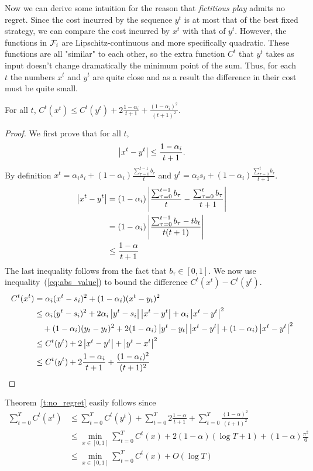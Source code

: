Now we can derive some intuition for the reason that \emph{fictitious play}
admits no regret. Since the cost incurred by the sequence $y^t$ is at most that
of the best fixed strategy, we can compare the cost incurred by $x^t$ with
that of $y^t$.  However, the functions in $\mathcal{F}_i$ are Lipschitz-continuous and more 
specifically quadratic. 
These functions are all "similar" to each other, so the extra function $C^t$ that $y^t$ takes
as input doesn't change dramatically the minimum point of the sum.
Thus, for each $t$ the numbers $x^t$ and $y^t$ are quite
close and as a result the difference in their cost must be quite small.

\begin{lemma}
  For all $t$,
  \(C^t(x^t) \leq C^t(y^t) + 2\frac{1-\alpha_i}{t+1} + \frac{(1-\alpha_i)^2}{(t+1)^2}\).
\end{lemma}
\begin{proof}
  We first prove that for all $t$,
  \begin{equation}\label{eq:abs_value}
    \left|x^t - y^t \right| \leq \frac{1-\alpha_i}{t+1}.
  \end{equation}
  By definition
  \(x^t = \alpha_i s_i + (1-\alpha_i)\frac{\sum_{\tau = 0}^{t-1} b_\tau}{t}\)
  and
  \( y^t = \alpha_i s_i + (1-\alpha_i)\frac{\sum_{\tau = 0}^t b_\tau}{t+1}\).
  \begin{align*}
    \left|x^t - y^t\right|
    &=
    (1-\alpha_i)\left|\frac{\sum_{\tau = 0}^{t-1}b_\tau}{t}
    - \frac{\sum_{\tau = 0}^t b_\tau}{t+1}\right|\\
    &=
    (1-\alpha_i)\left|\frac{\sum_{\tau = 0}^{t-1}b_\tau -tb_t}{t(t+1)}\right|\\
    &\leq
    \frac{1-\alpha}{t+1}
  \end{align*}
  The last inequality follows from the fact that $b_\tau \in [0,1]$.
  We now use inequality~(\ref{eq:abs_value}) to bound the difference
  \( C^t(x^t) - C^t(y^t) \).
  \begin{align*}
    C^t(x^t)
    &=
    \alpha_i(x^t - s_i)^2 + (1 - \alpha_i)(x^t - y_t)^2 \\
    &\leq
    \alpha_i(y^t - s_i)^2 + 2\alpha_i\left|y^t -
    s_i\right|\left|x^t - y^t\right| + \alpha_i \left|x^t - y^t\right|^2 \\
    &\quad + (1-\alpha_i)(y_t - y_t)^2 +
    2(1-\alpha_i)\left|y^t - y_t\right|\left|x^t-y^t\right| + (1 - \alpha_i)\left|x^t - y^t\right|^2\\
    &\leq
    C^t(y^t) + 2\left|x^t - y^t\right| + \left|y^t - x^t\right|^2\\
    &\leq
    C^t(y^t) + 2\frac{1-\alpha_i}{t+1} + \frac{(1-\alpha_i)^2}{(t+1)^2}
  \end{align*}
\end{proof}

Theorem~\ref{t:no_regret} easily follows since
\begin{align*}
  \sum_{t=0}^T C^t(x^t)
  &\leq
  \sum_{t=0}^T C^t(y^t) + \sum_{t=0}^T 2\frac{1-\alpha}{t+1} +
  \sum_{t=0}^T \frac{(1-\alpha)^2}{(t+1)^2}\\
  &\leq
  \min_{x \in [0,1]} \sum_{t=0}^T C^t(x) +
  2(1-\alpha)(\log T + 1) + (1-\alpha)\frac{\pi^2}{6}\\
  &\leq
  \min_{x \in [0,1]} \sum_{t=0}^T C^t(x) + O(\log T)
\end{align*}
